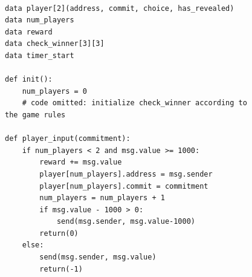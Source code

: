 \documentclass{llncs}
\begin{document}
\begin{figure}
\centering
\begin{minipage}{\columnwidth}%
\begin{mdframed}
\begin{verbatim}

data player[2](address, commit, choice, has_revealed)
data num_players
data reward
data check_winner[3][3]
data timer_start

def init():
	num_players = 0
	# code omitted: initialize check_winner according to the game rules

def player_input(commitment):
	if num_players < 2 and msg.value >= 1000:
		reward += msg.value
		player[num_players].address = msg.sender
		player[num_players].commit = commitment
		num_players = num_players + 1
		if msg.value - 1000 > 0:
			send(msg.sender, msg.value-1000)
		return(0)
	else:	
		send(msg.sender, msg.value)
		return(-1)
		

\end{verbatim}
\end{mdframed}
\end{minipage}
\end{figure}
\end{document}
